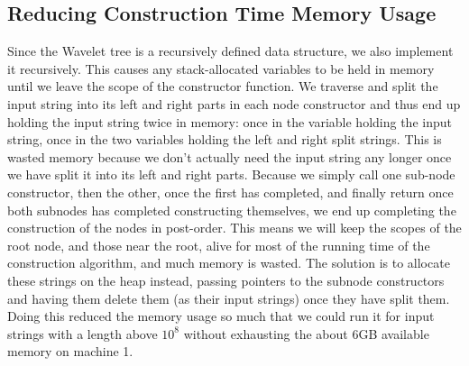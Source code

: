 \subsection{Reducing Construction Time Memory Usage}
Since the Wavelet tree is a recursively defined data structure, we also implement it recursively.
This causes any stack-allocated variables to be held in memory until we leave the scope of the constructor function.
We traverse and split the input string into its left and right parts in each node constructor and thus end up holding the input string twice in memory: once in the variable holding the input string, once in the two variables holding the left and right split strings.
This is wasted memory because we don't actually need the input string any longer once we have split it into its left and right parts.
Because we simply call one sub-node constructor, then the other, once the first has completed, and finally return once both subnodes has completed constructing themselves, we end up completing the construction of the nodes in post-order.
This means we will keep the scopes of the root node, and those near the root, alive for most of the running time of the construction algorithm, and much memory is wasted.
The solution is to allocate these strings on the heap instead, passing pointers to the subnode constructors and having them delete them (as their input strings) once they have split them.
Doing this reduced the memory usage so much that we could run it for input strings with a length above $10^8$ without exhausting the about 6GB available memory on machine 1.



